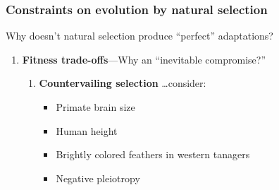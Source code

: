 \begin{noheadline}
\begin{frame}[t]
    \frametitle{Constraints on evolution by natural selection}
    \begin{adjustwidth}{-1.5em}{-1.5em}
        \vspace{-4mm}
        Why doesn't natural selection produce ``perfect'' adaptations?
        
        \begin{enumerate}
            \item \textbf{Fitness trade-offs}---Why an ``inevitable compromise?''
                
                \begin{enumerate}
                    \normalsize
                    \addtocounter{enumii}{2}
                    \item \textbf{Countervailing selection} \ldots consider:
                        \begin{itemize}
                        \normalsize
                            \item Primate brain size

                                \vspace{4mm}
                            \item Human height
                            \item Brightly colored feathers in western tanagers

                                \vspace{4mm}
                            \item Negative pleiotropy

                        \end{itemize}
                \end{enumerate}
        \end{enumerate}
    \end{adjustwidth}
\end{frame}
\end{noheadline}

